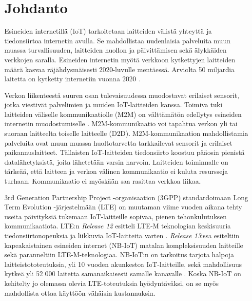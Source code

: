 \documentclass[finnish, 12pt, a4paper, elec, latin1, utf8, online]{aaltothesis}
\begin{document}
\section{Johdanto}

Esineiden internetillä (IoT) tarkoitetaan laitteiden välistä yhteyttä ja tiedonsiirtoa internetin avulla. Se mahdollistaa uudenlaisia palveluita muun muassa turvallisuuden, laitteiden huollon ja päivittämisen sekä älykkäiden verkkojen saralla. Esineiden internetin myötä verkkoon kytkettyjen laitteiden määrä kasvaa räjähdysmäisesti 2020-luvulle mentäessä. Arviolta 50 miljardia laitetta on kytketty internetiin vuonna 2020 \cite{ratasuk2016nb}.

Verkon liikenteestä suuren osan tulevaisuudessa muodostavat erilaiset sensorit, jotka viestivät palvelimien ja muiden IoT-laitteiden kanssa. Toimiva tuki laitteiden väliselle kommunikaatiolle (M2M) on välttämätön edellytys esineiden internetin muodostumiselle \cite{nokiawhitepaper}. M2M-kommunikaatio voi tapahtua verkon yli tai suoraan laitteelta toiselle laitteelle (D2D). M2M-kommunikaation mahdollistamia palveluita ovat muun muassa huoltotarvetta tarkkailevat sensorit ja erilaiset paikannuslaitteet. Tällaisten IoT-laitteiden tiedonsiirto koostuu pääosin pienistä datalähetyksistä, joita lähetetään varsin harvoin. Laitteiden toiminnalle on tärkeää, että laitteen ja verkon välinen kommunikaatio ei kuluta resursseja turhaan. Kommunikaatio ei myöskään saa rasittaa verkkoa liikaa.

3rd Generation Partnership Project -organisaation (3GPP) standardoimaan Long Term Evolution -järjestelmään (LTE) on muutaman viime vuoden aikana tehty useita päivityksiä tukemaan IoT-laitteille sopivaa, pienen tehonkulutuksen kommunikaatiota. LTE:n \textit{Release 12} \cite{release12} esitteli LTE-M teknologian keskisuuria tiedonsiirtonopeuksia ja liikkuvia IoT-laitteita varten \cite{ratasuk2016overview}. \textit{Release 13}:ssa \cite{release13} esiteltiin kapeakaistainen esineiden internet (NB-IoT) matalan kompleksisuuden laitteille sekä paranneltiin LTE-M-teknologiaa. NB-IoT:n on tarkoitus tarjota halpoja laitteistototeutuksia, yli 10 vuoden akunkestoa IoT-laitteille, sekä mahdollisuus kytkeä yli 52 000 laitetta samanaikaisesti samalle kanavalle \cite{nokiawhitepaper}. Koska NB-IoT on kehitelty jo olemassa olevia LTE-toteutuksia hyödyntäväksi, on se myös mahdollista ottaa käyttöön vähäisin kustannuksin.
\end{document}
